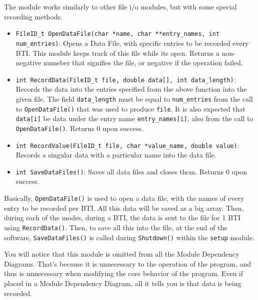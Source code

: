 \documentclass[letterpaper]{article}
\begin{document}
The module works similarly to other file i/o modules, but with some special recording methods.
\begin{itemize}
    \item \texttt{FileID\_t OpenDataFile(char *name, char **entry\_names, int num\_entries)}: Opens a Data File, with specific entries to be recorded every BTI. This module keeps track of this file while its open. Returns a non-negative numeber that signifies the file, or negative if the operation failed.
    \item \texttt{int RecordData(FileID\_t file, double data[], int data\_length)}: Records the data into the entries specified from the above function into the given file. The field \texttt{data\_length} must be equal to \texttt{num\_entries} from the call to \texttt{OpenDataFile()} that was used to produce \texttt{file}. It is also expected that \texttt{data[i]} be data under the entry name \texttt{entry\_names[i]}, also from the call to \texttt{OpenDataFile()}. Returns 0 upon success.
    \item \texttt{int RecordValue(FileID\_t file, char *value\_name, double value)}: Records a singular data with a particular name into the data file.
    \item \texttt{int SaveDataFiles()}: Saves all data files and closes them. Returns 0 upon success.
\end{itemize}

Basically, \texttt{OpenDataFile()} is used to open a data file, with the names of every entry to be recorded per BTI. All this data will be saved as a big array. Then, during each of the modes, during a BTI, the data is sent to the file for 1 BTI using \texttt{RecordData()}. Then, to save all this into the file, at the end of the software, \texttt{SaveDataFiles()} is called during \texttt{Shutdown()} within the \texttt{setup} module.

\begin{tcolorbox}[colframe=yellow!50!orange!50!black!75, title=Interesting Feature]
    You will notice that this module is omitted from all the Module Dependency Diagrams. That's because it is unnecessary to the operation of the program, and thus is unnecessary when modifying the core behavior of the program. Even if placed in a Module Dependency Diagram, all it tells you is that data is being recorded.
\end{tcolorbox}
\end{document}

